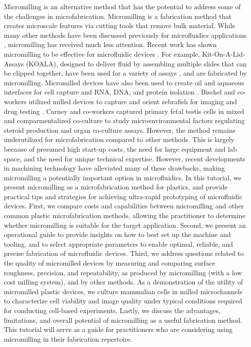 Micromilling is an alternative method that has the potential to address some of the challenges in microfabrication. Micromilling is a fabrication method that creates microscale features via cutting tools that remove bulk material. While many other methods have been discussed previously for microfluidics applications \cite{Becker2000,Becker2000a}, micromilling has received much less attention. Recent work has shown micromilling to be effective for microfluidic devices \cite{Kummrow2009, Wilson2011}. For example, Kit-On-A-Lid-Assays (KOALA), designed to deliver fluid by assembling multiple slides that can be clipped together, have been used for a variety of assays \cite{Berthier2013, Guckenberger2015}, and are fabricated by micromilling. Micromilled devices have also been used to create oil and aquaeous interfaces for cell capture and RNA, DNA, and protein isolation \cite{Casavant2013b, Strotman2013}. Bischel and co-workers utilized milled devices to capture and orient zebrafish for imaging and drug testing \cite{Bischel2013b}. Carney and co-workers captured primary fetal testis cells in mixed and comparmentalized co-culture to study microenvironmental factors regulating steroid production and organ co-culture assays. However, the method remains underutilized for microfabrication compared to other methods. This is largely because of presumed high start-up costs, the need for large equipment and lab space, and the need for unique technical expertise. However, recent developments in machining technology have alleviated many of these drawbacks, making micromilling a potentially important option in microfluidics. 
In this tutorial, we present micromilling as a microfabrication method for plastics, and provide practical tips and strategies for achieving ultra-rapid prototyping of microfluidic devices. First, we compare costs and capabilities between micromilling and other common plastic microfabrication methods, allowing the practitioner to determine whether micromilling is suitable for the target application. Second, we present an operational guide to provide insights on how to best set up the machine and tooling, and to select appropriate parameters to enable optimal, reliable, and precise fabrication of microfluidic devices. Third, we address questions related to the quality of micromilled devices by measuring and comparing surface roughness, precision, and repeatability, as produced by micromilling (with a low cost milling system), and by other methods. As a demonstration of the utility of micromilled plastic devices, we culture mammalian cells in milled microchannels to characterize cell viability and image quality under typical conditions required for conducting cell-based experiments. Lastly, we discuss the advantages, limitations, and overall potential of micromilling as a useful fabrication method. This tutorial will serve as a guide for practitioners who are considering using micromilling in their fabrication repertoire.


